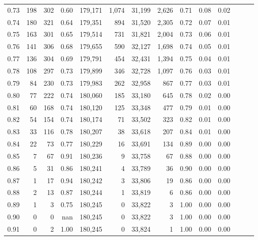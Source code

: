 \begin{tabular}{rrrrrrrrrrrrrr}
0.73 &    198 &  302 &  0.60 &  179,171 &    1,074 &  31,199 &   2,626 &  0.71 &  0.08 &      0.02 \\
0.74 &    180 &  321 &  0.64 &  179,351 &      894 &  31,520 &   2,305 &  0.72 &  0.07 &      0.01 \\
0.75 &    163 &  301 &  0.65 &  179,514 &      731 &  31,821 &   2,004 &  0.73 &  0.06 &      0.01 \\
0.76 &    141 &  306 &  0.68 &  179,655 &      590 &  32,127 &   1,698 &  0.74 &  0.05 &      0.01 \\
0.77 &    136 &  304 &  0.69 &  179,791 &      454 &  32,431 &   1,394 &  0.75 &  0.04 &      0.01 \\
0.78 &    108 &  297 &  0.73 &  179,899 &      346 &  32,728 &   1,097 &  0.76 &  0.03 &      0.01 \\
0.79 &     84 &  230 &  0.73 &  179,983 &      262 &  32,958 &     867 &  0.77 &  0.03 &      0.01 \\
0.80 &     77 &  222 &  0.74 &  180,060 &      185 &  33,180 &     645 &  0.78 &  0.02 &      0.00 \\
0.81 &     60 &  168 &  0.74 &  180,120 &      125 &  33,348 &     477 &  0.79 &  0.01 &      0.00 \\
0.82 &     54 &  154 &  0.74 &  180,174 &       71 &  33,502 &     323 &  0.82 &  0.01 &      0.00 \\
0.83 &     33 &  116 &  0.78 &  180,207 &       38 &  33,618 &     207 &  0.84 &  0.01 &      0.00 \\
0.84 &     22 &   73 &  0.77 &  180,229 &       16 &  33,691 &     134 &  0.89 &  0.00 &      0.00 \\
0.85 &      7 &   67 &  0.91 &  180,236 &        9 &  33,758 &      67 &  0.88 &  0.00 &      0.00 \\
0.86 &      5 &   31 &  0.86 &  180,241 &        4 &  33,789 &      36 &  0.90 &  0.00 &      0.00 \\
0.87 &      1 &   17 &  0.94 &  180,242 &        3 &  33,806 &      19 &  0.86 &  0.00 &      0.00 \\
0.88 &      2 &   13 &  0.87 &  180,244 &        1 &  33,819 &       6 &  0.86 &  0.00 &      0.00 \\
0.89 &      1 &    3 &  0.75 &  180,245 &        0 &  33,822 &       3 &  1.00 &  0.00 &      0.00 \\
0.90 &      0 &    0 &   nan &  180,245 &        0 &  33,822 &       3 &  1.00 &  0.00 &      0.00 \\
0.91 &      0 &    2 &  1.00 &  180,245 &        0 &  33,824 &       1 &  1.00 &  0.00 &      0.00 \\

\end{tabular}
